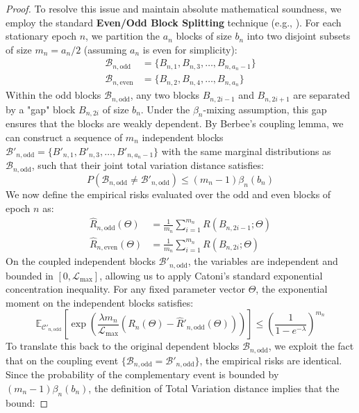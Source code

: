 \begin{proof}
To resolve this issue and maintain absolute mathematical soundness, we employ the standard \textbf{Even/Odd Block Splitting} technique (e.g., \cite{alquier2013pac}). For each stationary epoch $n$, we partition the $a_n$ blocks of size $b_n$ into two disjoint subsets of size $m_n = a_n / 2$ (assuming $a_n$ is even for simplicity):
\begin{align}
    \mathcal{B}_{n, \text{odd}} &= \{B_{n, 1}, B_{n, 3}, \dots, B_{n, a_n-1}\} \\
    \mathcal{B}_{n, \text{even}} &= \{B_{n, 2}, B_{n, 4}, \dots, B_{n, a_n}\}
\end{align}
Within the odd blocks $\mathcal{B}_{n, \text{odd}}$, any two blocks $B_{n, 2i-1}$ and $B_{n, 2i+1}$ are separated by a "gap" block $B_{n, 2i}$ of size $b_n$. Under the $\beta_n$-mixing assumption, this gap ensures that the blocks are weakly dependent. By Berbee's coupling lemma, we can construct a sequence of $m_n$ independent blocks $\mathcal{B}'_{n, \text{odd}} = \{B'_{n, 1}, B'_{n, 3}, \dots, B'_{n, a_n-1}\}$ with the same marginal distributions as $\mathcal{B}_{n, \text{odd}}$, such that their joint total variation distance satisfies:
\begin{equation}
    P\left(\mathcal{B}_{n, \text{odd}} \neq \mathcal{B}'_{n, \text{odd}}\right) \le (m_n - 1) \beta_n(b_n)
\end{equation}
We now define the empirical risks evaluated over the odd and even blocks of epoch $n$ as:
\begin{align}
    \hat{R}_{n, \text{odd}}(\Theta) &= \frac{1}{m_n} \sum_{i=1}^{m_n} R(B_{n, 2i-1}; \Theta) \\
    \hat{R}_{n, \text{even}}(\Theta) &= \frac{1}{m_n} \sum_{i=1}^{m_n} R(B_{n, 2i}; \Theta)
\end{align}
On the coupled independent blocks $\mathcal{B}'_{n, \text{odd}}$, the variables are independent and bounded in $[0, \mathcal{L}_{\max}]$, allowing us to apply Catoni's standard exponential concentration inequality. For any fixed parameter vector $\Theta$, the exponential moment on the independent blocks satisfies:
\begin{equation}
    \mathbb{E}_{\mathcal{C}'_{n, \text{odd}}} \left[ \exp\left( \frac{\lambda m_n}{\mathcal{L}_{\max}} \left( R_n(\Theta) - \hat{R}'_{n, \text{odd}}(\Theta) \right) \right) \right] \le \left( \frac{1}{1 - e^{-\lambda}} \right)^{m_n}
\end{equation}
To translate this back to the original dependent blocks $\mathcal{B}_{n, \text{odd}}$, we exploit the fact that on the coupling event $\{\mathcal{B}_{n, \text{odd}} = \mathcal{B}'_{n, \text{odd}}\}$, the empirical risks are identical. Since the probability of the complementary event is bounded by $(m_n - 1) \beta_n(b_n)$, the definition of Total Variation distance implies that the bound:

\end{proof}
